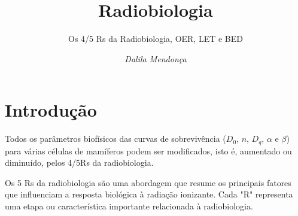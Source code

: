 \documentclass[11pt,a4paper]{article}
\title{\LobsterTwo\Huge{Radiobiologia}}
\author{\LobsterTwo\Large{Os 4/5 Rs da Radiobiologia, OER, LET e BED}\nocite{*}}
\date{\LobsterTwo\textit{Dalila Mendonça}}
\begin{document}
	\maketitle

\section{Introdução}

  
	Todos os parâmetros biofísicos das curvas de sobrevivência ($D_0$, $n$, $D_q$, $\alpha$ e $\beta$) para várias células de mamíferos podem ser modificados, isto é, aumentado ou diminuído, pelos 4/5Rs da radiobiologia. 

	Os 5 Rs da radiobiologia são uma abordagem que resume os principais fatores que influenciam a resposta biológica à radiação ionizante. Cada "R" representa uma etapa ou característica importante relacionada à radiobiologia.
\end{document}
